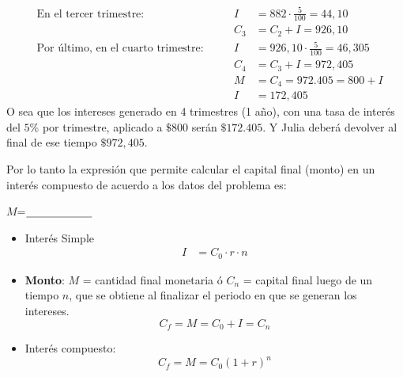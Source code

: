 \documentclass[12pt]{examdesign}
\theoremstyle{plain}
\theoremstyle{definition}
\theoremstyle{remark}
\begin{document}
\begin{endmatter}
\begin{align*}
        	&\mbox{En el tercer trimestre: }               &&&        I&=882\cdot \frac{5}{100}=44,10      \\
        	&                                              &&&      C_3&=C_{2}+I=926,10                    \\
        	&\mbox{Por último, en el cuarto trimestre: }   &&&        I&=926,10 \cdot \frac{5}{100}=46,305 \\
        	&                                              &&&    C_{4}&=C_{3}+I=972,405                   \\
        	&                                              &&&        M&=C_4=972.405=800+I                 \\ 
        	&                                              &&&        I&=172,405
        \end{align*}
        O sea que los intereses generado en 4 trimestres (1 año), con una tasa de interés del $5\%$ por trimestre, aplicado a $\$800$ serán $\$172.405$. Y Julia deberá devolver al final de ese tiempo $\$972,405$.
        
        Por lo tanto la expresión que permite calcular el capital final (monto) en un interés compuesto de acuerdo a los datos del problema es:
        
        \begin{center}
        	\def\blank#1{$\underline{\mbox{\hphantom{#1}}}$}
        	$M$=\blank{------------------}
        \end{center}
        \vspace{.1cm}
        \begin{tcolorbox}[colback=red!10!white, colframe=tealgreen, title=\textbf{Resumen de las Formulas:}]
        	\begin{itemize}
        		\item Interés Simple
        		\begin{align*}
        		    I &= C_{0}\cdot r\cdot n
        		\end{align*}
        		\item \textbf{Monto}: $M$ = cantidad final monetaria ó $C_{n}$ = capital final luego de un tiempo $n$, que se obtiene al finalizar el periodo en que se generan los intereses.
        		\begin{equation}
        		C_{f}= M = C_{0} + I = C_{n}
        		\end{equation}
        		\item Interés compuesto:
        			\begin{equation}
        		        C_{f}= M = C_{0}\left(1+r\right)^{n}
        		    \end{equation}
        	\end{itemize}
        \end{tcolorbox}
    \end{endmatter}
\end{document}
